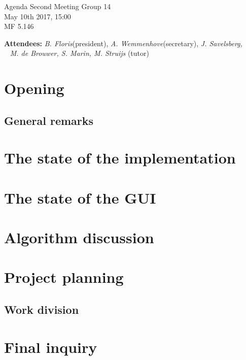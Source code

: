 \documentclass[a4paper,twoside,11pt]{article}
\title{}
\date{}
\begin{document}

\begin{center}
\Huge{Agenda Second Meeting Group 14}
\\\vspace*{2mm}
\Large{May 10th 2017, 15:00}
\\\vspace*{2mm}
\large{MF 5.146}
\\
		\end{center}

		\textbf{Attendees:} \textit{B. Floris}(president), \textit{A. Wemmenhove}(secretary), \textit{J. Savelsberg, 
\\\indent\qquad\,\,\,\,\,\qquad\quad M. de Brouwer, S. Marin, M. Struijs} (tutor)



	\section{Opening}
	\subsection*{\hspace{1.9em}General remarks}

	\section{The state of the implementation}

	\section{The state of the GUI}

	\section{Algorithm discussion}
	
	\section{Project planning}
		\subsection*{\hspace{1.9em}Work division}

	\section{Final inquiry}

	
\end{document}

